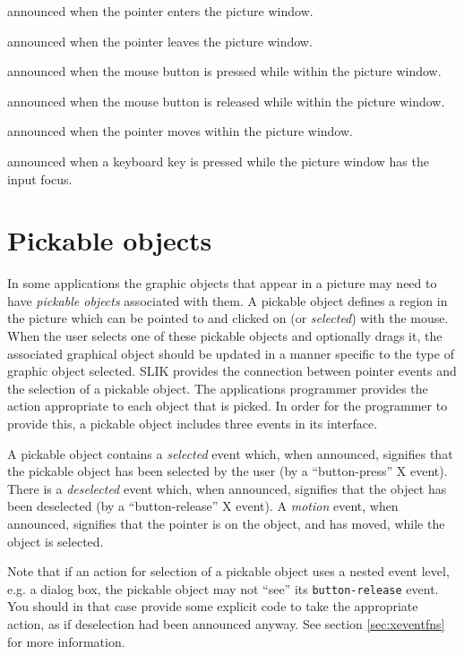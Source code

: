 \documentclass[twoside,openright,11pt]{report}
\newcommand{\tp}[1]{\texttt{#1}}
\begin{document}
{announced when the pointer enters the picture window.}

{announced when the pointer leaves the picture window.}

{announced when the mouse button is pressed while within the picture
window.}

{announced when the mouse button is released while within the picture
window.}

{announced when the pointer moves within the picture window.}

{announced when a keyboard key is pressed while the picture window has
the input focus.}

\section{Pickable objects} \label{sec:pick}

In some applications the graphic objects that appear in a picture may
need to have \emph{pickable objects}
associated with them.  A pickable object defines a region in the
picture which can be pointed to and clicked on (or \emph{selected\/})
with the mouse.  When the user selects one of these pickable objects
and optionally drags it, the associated graphical object should be
updated in a manner specific to the type of graphic object selected.
SLIK provides the connection between pointer events and the selection
of a pickable object.  The applications programmer provides the action
appropriate to each object that is picked.  In order for the
programmer to provide this, a pickable object includes three events in
its interface.

A pickable object contains a \emph{selected\/} event which, when
announced, signifies that the pickable object has been selected by the
user (by a ``button-press'' X event).  There is a \emph{deselected}
event which, when announced, signifies that the object has been
deselected (by a ``button-release'' X event).  A \emph{motion} event,
when announced, signifies that the pointer is on the object, and has
moved, while the object is selected.

Note that if an action for selection of a pickable object uses a
nested event level, e.g. a dialog box, the pickable object may not
``see'' its \tp{button-release} event.  You should in that case
provide some explicit code to take the appropriate action, as if
deselection had been announced anyway.  See section
\ref{sec:xeventfns} for more information.
\end{document}
